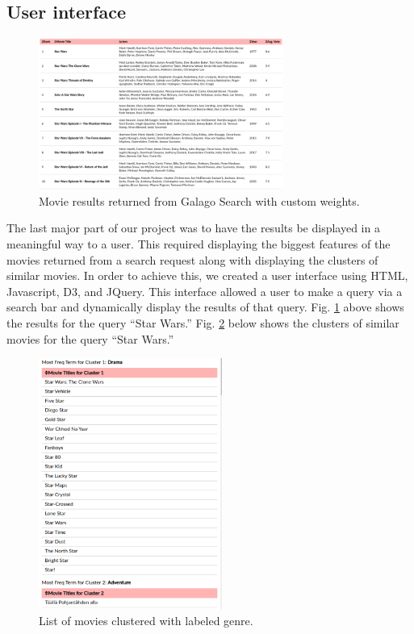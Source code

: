 \documentclass[sigconf]{acmart}
\begin{document}
\subsection{User interface}

\begin{figure}[h]
  \centering
  \includegraphics[width=8cm]{images/image3.png}
  \caption{Movie results returned from Galago Search with custom weights.}
  \label{fig:results}
\end{figure}

The last major part of our project was to have the results be displayed in a meaningful way to a user. This required displaying the biggest features of the movies returned from a search request along with displaying the clusters of similar movies. In order to achieve this, we created a user interface using HTML, Javascript, D3, and JQuery. This interface allowed a user to make a query via a search bar and dynamically display the results of that query. Fig. \ref{fig:results} above shows the results for the query ``Star Wars.'' Fig. \ref{fig:clusters_list} below shows the clusters of similar movies for the query ``Star Wars.''

\begin{figure}[h]
  \centering
  \includegraphics[width=6cm]{images/image4.png}
  \caption{List of movies clustered with labeled genre.}
  \label{fig:clusters_list}
\end{figure}
\end{document}
